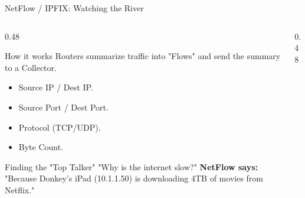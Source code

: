 \documentclass[aspectratio=169]{beamer}  %
\begin{document}
\begin{frame}{NetFlow / IPFIX: Watching the River}
    \begin{columns}[T]
        \begin{column}{0.48\textwidth}
            \begin{block}{How it works}
                \footnotesize
                Routers summarize traffic into "Flows" and send the summary to a Collector.
                \begin{itemize}
                    \item Source IP / Dest IP.
                    \item Source Port / Dest Port.
                    \item Protocol (TCP/UDP).
                    \item Byte Count.
                \end{itemize}
            \end{block}
            \begin{exampleblock}{Finding the "Top Talker"}
                \footnotesize
                "Why is the internet slow?"
                \textbf{NetFlow says:} "Because Donkey's iPad (10.1.1.50) is downloading 4TB of movies from Netflix."
            \end{exampleblock}
        \end{column}
        \begin{column}{0.48\textwidth}
            \begin{center}
            \end{center}
        \end{column}
    \end{columns}
\end{frame}
\end{document}
